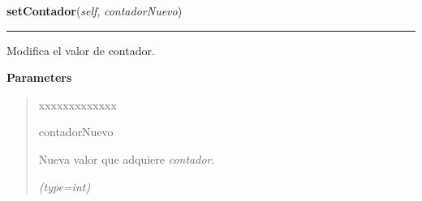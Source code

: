     \label{grafico:Grafico:setContador}

    \vspace{0.5ex}

\hspace{.8\funcindent}\begin{boxedminipage}{\funcwidth}

    \raggedright \textbf{setContador}(\textit{self}, \textit{contadorNuevo})

    \vspace{-1.5ex}

    \rule{\textwidth}{0.5\fboxrule}
\setlength{\parskip}{2ex}
    Modifica el valor de contador.

\setlength{\parskip}{1ex}
      \textbf{Parameters}
      \vspace{-1ex}

      \begin{quote}
        \begin{Ventry}{xxxxxxxxxxxxx}

          \item[contadorNuevo]

          Nueva valor que adquiere \textit{contador}.

            {\it (type=int)}

        \end{Ventry}

      \end{quote}

    \end{boxedminipage}

    \label{grafico:Grafico:leerDocumentoTodasCategorias}

    \vspace{0.5ex}

